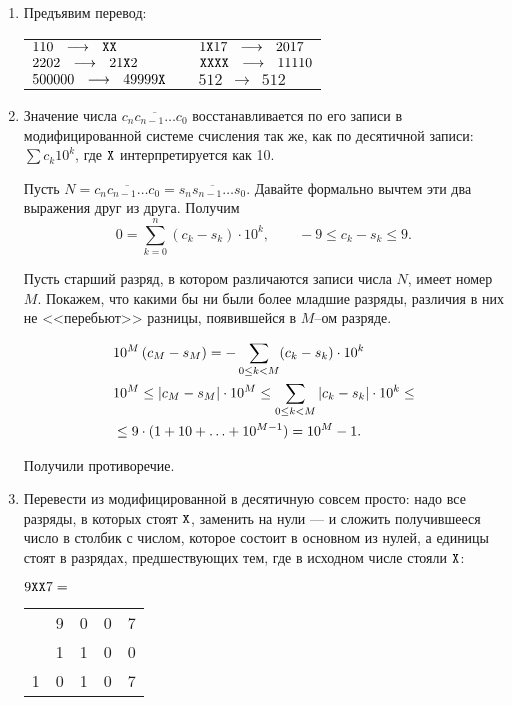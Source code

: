 ﻿

\begin{enumerate}

\item Предъявим перевод:

\def\ra{\ \ \longrightarrow\ \ }
\def\X{\text{\ttfamily X}}
\begin{center}\begin{tabular}{lll}
	$110 \ra \X\X$ & \quad & $1\X17 \ra 2017$ \\
	$2202 \ra 21\X2$ & & $\X\X\X\X \ra 11110$ \\
	$500000 \ra 49999\X$ & & $512 \ra 512$
\end{tabular}\end{center}

\item Значение числа $\overline{c_nc_{n-1}\ldots c_0}$ восстанавливается по его записи в модифицированной системе счисления так же, как по десятичной записи: $\sum c_k10^k$, где $\X$ интерпретируется как 10.

Пусть $N = \overline{c_nc_{n-1}\ldots c_0} = \overline{s_ns_{n-1}\ldots s_0}$. Давайте формально вычтем эти два выражения друг из друга. Получим
$$0 = \sum\limits_{k=0}^n (c_k-s_k) \cdot 10^k, \qquad -9 \le c_k-s_k \le 9.$$

Пусть старший разряд, в котором различаются записи числа $N$, имеет номер $M$. Покажем, что какими бы ни были более младшие разряды, различия в них не <<перебьют>> разницы, появившейся в $M$--ом разряде.

\begin{align*}
	& 10^M \left( c_M-s_M \right) =
		- \sum\limits_{0 \le k < M} (c_k-s_k) \cdot 10^k \\
	& 10^M \le \left| c_M-s_M \right| \cdot 10^M \le
		\sum\limits_{0 \le k < M} \left| c_k-s_k \right| \cdot 10^k \le \\
	& \le 9 \cdot (1 + 10 + \ldots + 10^{M-1}) = 10^M-1.
\end{align*}

Получили противоречие.

\item Перевести из модифицированной в десятичную совсем просто: надо все разряды, в которых стоят $\X$, заменить на нули — и сложить получившееся число в столбик с числом, которое состоит в основном из нулей, а единицы стоят в разрядах, предшествующих тем, где в исходном числе стояли $\X$:

\begin{center}
$9\X\X7 =$ \begin{tabular}{ccccc}
	   & 9 & 0 & 0 & 7 \\
	   & 1 & 1 & 0 & 0 \\ \hline
	1 & 0 & 1 & 0 & 7 \\
\end{tabular} \end{center}


\end{enumerate}

